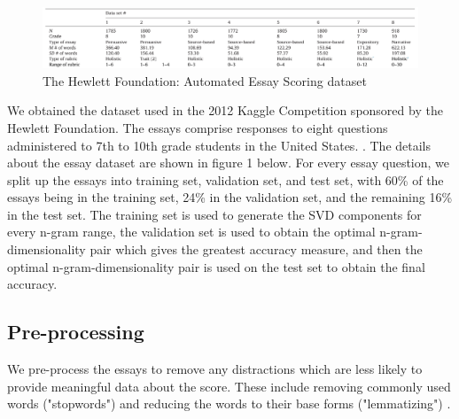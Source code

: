 \documentclass[10pt,letterpaper]{article}
\begin{document}
\begin{figure}[ht]
\begin{center}
 \includegraphics[scale = 0.7]{img/DatasetArray.png}
\end{center}
 \caption{The Hewlett Foundation: Automated Essay Scoring dataset \cite{shermis2014state}}
\end{figure}

We obtained the dataset used in the 2012 Kaggle Competition sponsored by the Hewlett Foundation. The essays comprise responses to eight questions administered to 7th to 10th grade students in the United States. \cite{hewlett2012aes}. The details about the essay dataset are shown in figure 1 below. For every essay question, we split up the essays into training set, validation set, and test set, with 60\% of the essays being in the training set, 24\% in the validation set, and the remaining 16\% in the test set. The training set is used to generate the SVD components for every n-gram range, the validation set is used to obtain the optimal n-gram-dimensionality pair which gives the greatest accuracy measure, and then the optimal n-gram-dimensionality pair is used on the test set to obtain the final accuracy.

\subsection{Pre-processing}

We pre-process the essays to remove any distractions which are less likely to provide meaningful data about the score. These include removing commonly used words ("stopwords") and reducing the words to their base forms ("lemmatizing") \cite{islam2010automated}.
\end{document}
